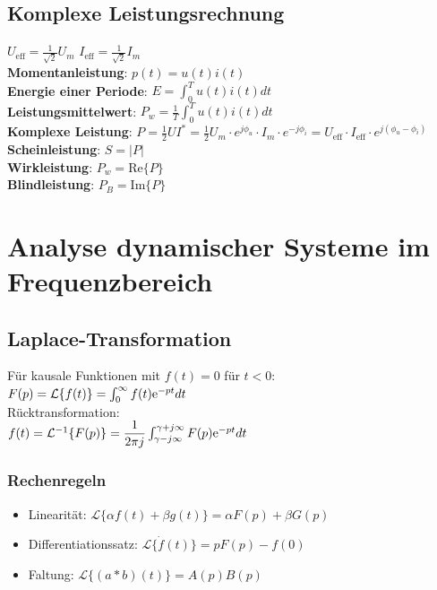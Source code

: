 \documentclass[fs, footer]{latex4ei}
\begin{document}
\begin{multicols*}{4}
{        \subsection{Komplexe Leistungsrechnung}
        $U_{\text{eff}} = \frac{1}{\sqrt{2}}U_m$\quad
        $I_{\text{eff}} = \frac{1}{\sqrt{2}}I_m$\\
        \textbf{Momentanleistung}: $p(t) = u(t)i(t)$\\
        \textbf{Energie einer Periode}: $E=\int_0^Tu(t)i(t)dt$\\
        \textbf{Leistungsmittelwert}: $P_w = \frac{1}{T} \int_0^T u(t)i(t)dt$\\
        \textbf{Komplexe Leistung}: $P = \frac{1}{2}UI^* = \frac{1}{2}U_m\cdot e^{j\phi_u}\cdot I_m\cdot e^{-j\phi_i} = U_{\text{eff}}\cdot I_{\text{eff}}\cdot e^{j(\phi_u-\phi_i)}$\\
        \textbf{Scheinleistung}: $S = |P|$\\
        \textbf{Wirkleistung}: $P_w = \text{Re}\{P\}$\\
        \textbf{Blindleistung}: $P_B = \text{Im}\{P\}$
    }
    \section{Analyse dynamischer Systeme im Frequenzbereich}
    \subsection{Laplace-Transformation}
    Für kausale Funktionen mit $f(t) = 0$ für $t < 0$:\\
    $F(p) = \mathcal L\{f(t)\} = \int_0^\infty f(t) \mathrm{e}^{-pt}dt$\\
    Rücktransformation: \\
    $f(t) = \mathcal L^{-1}\{F(p)\} = \dfrac{1}{2\pi j}\int_{\gamma-j\infty}^{\gamma+j\infty} F(p) \mathrm{e}^{-pt}dt$\\
    \subsubsection{Rechenregeln}
    \begin{itemize}
        \item Linearität: $\mathcal L\{\alpha f(t) + \beta g(t)\} = \alpha F(p) + \beta G(p)$
        \item Differentiationssatz: $\mathcal L\{\dot f(t)\} = pF(p) - f(0)$
        \item Faltung: $\mathcal L\{(a * b)(t)\} = A(p)B(p)$
    \end{itemize}

\end{multicols*}
\end{document}
